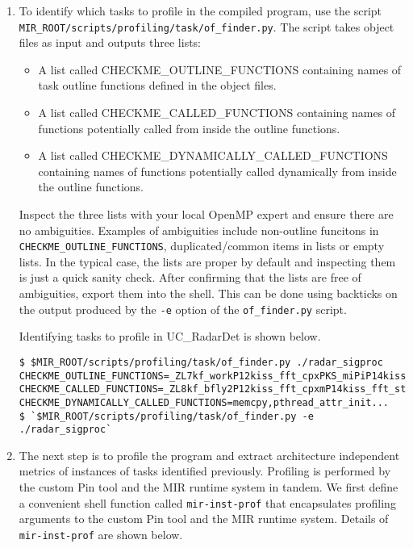 \documentclass[11pt,a4paper]{article}
\begin{document}
\begin{enumerate}
    \item To identify which tasks to profile in the compiled program, use the script \\ \texttt{MIR\_ROOT/scripts/profiling/task/of\_finder.py}. The script takes object files as input and outputs three lists:
        \begin{itemize}
            \item A list called CHECKME\_OUTLINE\_FUNCTIONS containing names of task outline functions defined in the object files.
            \item A list called CHECKME\_CALLED\_FUNCTIONS containing names of functions potentially called from inside the outline functions.
            \item A list called CHECKME\_DYNAMICALLY\_CALLED\_FUNCTIONS containing names of functions potentially called dynamically from inside the outline functions.
        \end{itemize}

Inspect the three lists with your local OpenMP expert and ensure there are no ambiguities. Examples of ambiguities include non-outline funcitons in \texttt{CHECKME\_OUTLINE\_FUNCTIONS}, duplicated/common items in lists or empty lists. In the typical case, the lists are proper by default and inspecting them is just a quick sanity check. After confirming that the lists are free of ambiguities, export them into the shell. This can be done using backticks on the output produced by the \texttt{-e} option of the \texttt{of\_finder.py} script.

Identifying tasks to profile in UC\_RadarDet is shown below.

\begin{lstlisting}[style=MyInputStyle]
$ $MIR_ROOT/scripts/profiling/task/of_finder.py ./radar_sigproc
CHECKME_OUTLINE_FUNCTIONS=_ZL7kf_workP12kiss_fft_cpxPKS_miPiP14kiss_fft_state._omp_fn.0,...
CHECKME_CALLED_FUNCTIONS=_ZL8kf_bfly2P12kiss_fft_cpxmP14kiss_fft_statei,...
CHECKME_DYNAMICALLY_CALLED_FUNCTIONS=memcpy,pthread_attr_init...
$ `$MIR_ROOT/scripts/profiling/task/of_finder.py -e ./radar_sigproc`
\end{lstlisting}

    \item The next step is to profile the program and extract architecture independent metrics of instances of tasks identified previously. Profiling is performed by the custom Pin tool and the MIR runtime system in tandem. We first define a convenient shell function called \texttt{mir-inst-prof} that encapsulates profiling arguments to the custom Pin tool and the MIR runtime system. Details of \texttt{mir-inst-prof} are shown below.


\end{enumerate}
\end{document}
